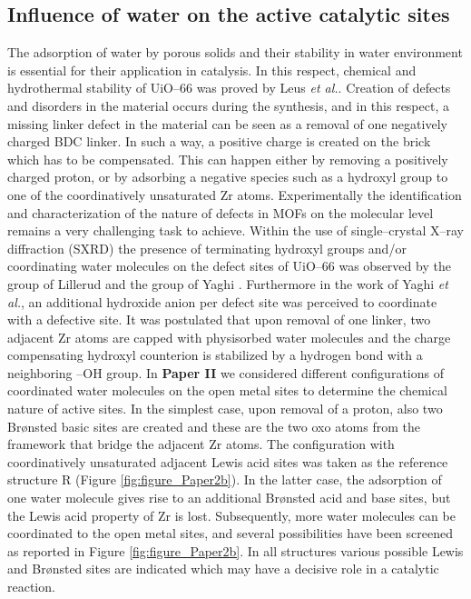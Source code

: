 \subsection*{Influence of water on the active catalytic sites}
The adsorption of water by porous solids and their stability in water
environment is essential for their application in catalysis. In this
respect, chemical and hydrothermal stability of UiO--66 was proved by Leus
\textit{et al.}\cite{Leus2016}. Creation of defects and disorders in the
material occurs during the synthesis, and in this respect, a missing
linker defect in the material can be seen as a removal of one negatively charged
BDC linker. In such a way, a positive charge is created on the brick which has
to be compensated. This can happen either by removing a positively charged
proton, or by adsorbing a negative species such as a hydroxyl group to one of the
coordinatively unsaturated Zr atoms. Experimentally the identification and
characterization of the nature of defects in MOFs on the molecular level remains a very challenging task to
achieve. Within the use of single--crystal X--ray diffraction (SXRD) the
presence of terminating hydroxyl groups and/or coordinating water molecules on the
defect sites of UiO--66 was observed by the group of Lillerud \cite{Oien2014}
and the group of Yaghi \cite{Trickett2015}. Furthermore in the work of Yaghi \textit{et
al.}\cite{Trickett2015}, an additional hydroxide anion per defect site was
perceived to coordinate with a defective  site. It was postulated that upon
removal of one linker, two adjacent Zr atoms are capped with physisorbed water
molecules and the charge compensating hydroxyl counterion is stabilized by a
hydrogen bond with a neighboring --OH group. In \textbf{Paper II}
we considered different configurations of coordinated water molecules on the
open metal sites to determine the chemical nature of active sites. 
In the simplest case, upon removal of a proton, also two Br\o{}nsted
basic sites are created and these are the two oxo atoms from the framework that
bridge the adjacent Zr atoms. The configuration with coordinatively unsaturated
adjacent Lewis acid sites was taken as the reference structure R (Figure
\ref{fig:figure_Paper2b}). In the latter case, the adsorption of one water
molecule gives rise to an additional Br\o{}nsted acid and base sites, but the
Lewis acid property of Zr is lost. Subsequently, more water molecules can be
coordinated to the open metal sites, and several possibilities have been
screened as reported in Figure \ref{fig:figure_Paper2b}. In all structures
various possible Lewis and Br\o{}nsted sites are indicated which may have a
decisive role in a catalytic reaction. 

